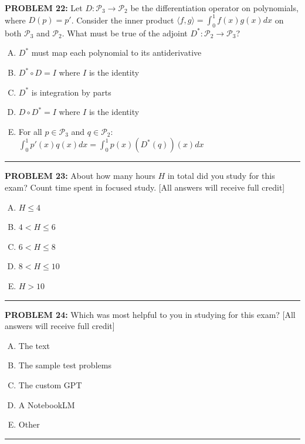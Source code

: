 \documentclass[12pt]{amsart}
\newcommand{\divider}{
  \vspace{-1em} %
  \noindent
  \raisebox{-0.15ex}{\textbullet}%
  \hspace{0.5em}%
  \rule[0.5ex]{0.95\textwidth}{1.0pt}%
  \hspace{0.5em}%
  \raisebox{-0.15ex}{\textbullet}%
  \vspace{0em} %
}
\begin{document}
{\bf PROBLEM 22:}
Let $D: \mathcal{P}_3 \to \mathcal{P}_2$ be the differentiation operator on polynomials, where $D(p) = p'$. 
Consider the inner product $\langle f, g \rangle = \int_0^1 f(x)g(x)dx$ on both $\mathcal{P}_3$ and $\mathcal{P}_2$. 
What must be true of the adjoint $D^*: \mathcal{P}_2 \to \mathcal{P}_3$?
\begin{enumerate}[(A)]
\item $D^*$ must map each polynomial to its antiderivative
\item $D^* \circ D = I$ where $I$ is the identity
\item $D^*$ is integration by parts
\item $D \circ D^* = I$ where $I$ is the identity
\item For all $p \in \mathcal{P}_3$ and $q \in \mathcal{P}_2$: $\int_0^1 p'(x)q(x)dx = \int_0^1 p(x)(D^*(q))(x)dx$
\end{enumerate}
%
\divider 

{\bf PROBLEM 23:}
About how many hours $H$ in total did you study for this exam? Count time spent in focused study.
[All answers will receive full credit]
\begin{enumerate}[(A)]
\item $H \leq 4$
\item $4< H\leq 6$
\item $6< H\leq 8$
\item $8< H\leq 10$
\item $H>10$
\end{enumerate}
%
\divider


{\bf PROBLEM 24:}
Which was most helpful to you in studying for this exam?
[All answers will receive full credit]
\begin{enumerate}[(A)]
\item The text
\item The sample test problems
\item The custom GPT
\item A NotebookLM
\item Other
\end{enumerate}
%
\divider
\end{document}
